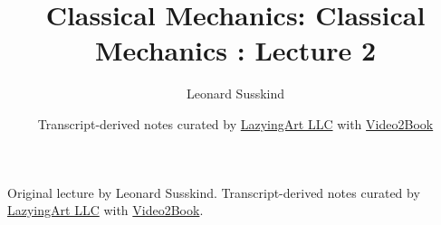 \documentclass[11pt,oneside]{book}
\begin{document}
\frontmatter
\title{Classical Mechanics: Classical Mechanics : Lecture 2}
\author{Leonard Susskind}
\date{Transcript-derived notes curated by \href{https://lazying.art}{LazyingArt LLC} with \href{https://github.com/lachlanchen/Video2Book}{Video2Book}}
\maketitle
\begin{center}
\small Original lecture by Leonard Susskind. Transcript-derived notes curated by \href{https://lazying.art}{LazyingArt LLC} with \href{https://github.com/lachlanchen/Video2Book}{Video2Book}.
\end{center}
\clearpage
\mainmatter

\end{document}
